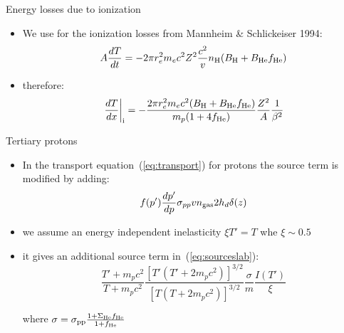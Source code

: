 \documentclass[9pt]{beamer}
\begin{document}
\begin{frame}{Energy losses due to ionization}

\begin{itemize}
\item We use for the ionization losses from Mannheim \& Schlickeiser 1994: 
\begin{equation}
A \frac{dT}{dt} = - 2 \pi r_e^2 m_e c^2 Z^2 \frac{c^2}{v} n_{\rm H} (B_{\rm H} + B_{\rm He} f_{\rm He})
\end{equation}

\item therefore:
\begin{equation}
\left.\frac{dT}{dx}\right|_{\rm i} = - \frac{2 \pi r_e^2 m_e c^2 (B_{\rm H} + B_{\rm He} f_{\rm He})}{m_p (1+4f_{\rm He})} \frac{Z^2}{A} \frac{1}{\beta^2}
\end{equation}

\end{itemize}

\end{frame}

\begin{frame}{Tertiary protons}

\begin{itemize}
\item In the transport equation~(\ref{eq:transport}) for protons the source term is modified by adding:
\begin{equation}
f(p') \frac{dp'}{dp} \sigma_{pp} v n_{\rm gas} 2 h_d \delta(z) 
\end{equation}

\item we assume an energy independent inelasticity $\xi T' = T$ whe $\xi \sim 0.5$

\item it gives an additional source term in~(\ref{eq:sourceslab}):
\begin{equation}
\frac{T' + m_p c^2}{T + m_p c^2} \frac{\left[T'(T'+2m_pc^2)\right]^{3/2}}{\left[T(T+2m_pc^2)\right]^{3/2}}\frac{\sigma}{m} \frac{I(T')}{\xi}
\end{equation}

where $\sigma = \sigma_{\rm pp} \frac{1+\Sigma_{\rm He} f_{\rm He}}{1+f_{\rm He}}$

\end{itemize}
\end{frame}
\end{document}
